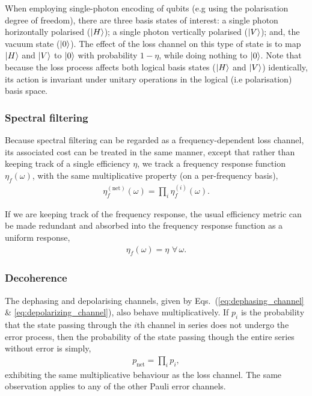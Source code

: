 When employing single-photon encoding of qubits (e.g using the polarisation degree of freedom), there are three basis states of interest: a single photon horizontally polarised ($|H\rangle$); a single photon vertically polarised ($|V\rangle$); and, the vacuum state ($|0\rangle$). The effect of the loss channel on this type of state is to map $|H\rangle$ and $|V\rangle$ to $|\mathrm{0}\rangle$ with probability \mbox{$1-\eta$}, while doing nothing to $|\mathrm{0}\rangle$. Note that because the loss process affects both logical basis states ($|H\rangle$ and $|V\rangle$) identically, its action is invariant under unitary operations in the logical (i.e polarisation) basis space.

%
%

\subsubsection{Spectral filtering} 

Because spectral filtering can be regarded as a frequency-dependent loss channel, its associated cost can be treated in the same manner, except that rather than keeping track of a single efficiency $\eta$, we track a frequency response function $\eta_f(\omega)$, with the same multiplicative property (on a per-frequency basis),
\begin{align}
	\eta_f^\mathrm{(net)}(\omega)=\prod_i \eta_f^{(i)}(\omega).
\end{align}

If we are keeping track of the frequency response, the usual efficiency metric can be made redundant and absorbed into the frequency response function as a uniform response,
\begin{align}
	\eta_f(\omega)=\eta\,\,\forall\,\omega.
\end{align}

%
%

\subsubsection{Decoherence}   

The dephasing and depolarising channels, given by Eqs.~(\ref{eq:dephasing_channel} \& \ref{eq:depolarizing_channel}), also behave multiplicatively. If $p_i$ is the probability that the state passing through the $i$th channel in series does not undergo the error process, then the probability of the state passing though the entire series without error is simply,
\begin{align}
p_\mathrm{net}=\prod_i p_i,
\end{align}
exhibiting the same multiplicative behaviour as the loss channel. The same observation applies to any of the other Pauli error channels.

